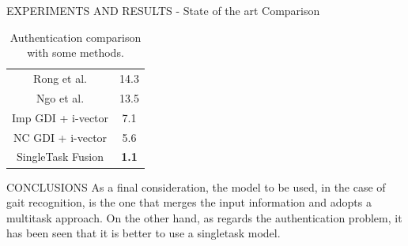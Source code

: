 \begin{frame}{EXPERIMENTS AND RESULTS - State of the art Comparison}
\begin{minipage}{\linewidth}
\begin{minipage}{0.45\linewidth}
\begin{table}[h!]
\begin{adjustbox}{max width=\textwidth}
\begin{tabular}{|c|c|}
                    Rong et al. & 14.3 \\
                    Ngo et al. & 13.5 \\
                    Imp GDI + i-vector & 7.1 \\
                    NC GDI + i-vector & 5.6 \\
                    \hline
                    SingleTask Fusion & \bfseries{1.1}\\
                    \hline
                \end{tabular}
                \end{adjustbox}
                \caption{Authentication comparison with some methods.}
                \label{Authentication comparison}
            \end{table}
        \end{minipage}
    \end{minipage}
\end{frame}

\begin{frame}{CONCLUSIONS}
    As a final consideration, the model to be used, in the case of gait recognition, 
    is the one that merges the input information and adopts a multitask 
    approach. On the other hand, as regards the authentication problem, it has 
    been seen that it is better to use a singletask model.
\end{frame}